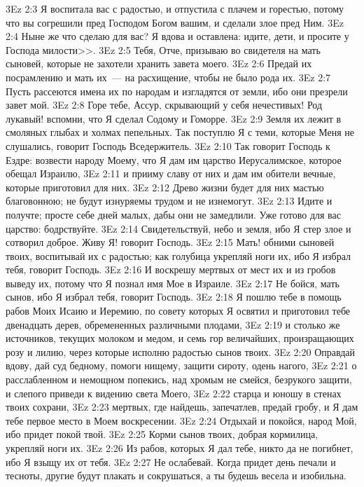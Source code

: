 \vs 3Ez 2:3 Я воспитала вас с радостью, и отпустила с плачем и горестью, потому что вы согрешили пред Господом Богом вашим, и сделали злое пред Ним.
\vs 3Ez 2:4 Ныне же что сделаю для вас? Я вдова и оставлена: идите, дети, и просите у Господа милости>>.
\vs 3Ez 2:5 Тебя, Отче, призываю во свидетеля на мать сыновей, которые не захотели хранить завета моего.
\vs 3Ez 2:6 Предай их посрамлению и мать их~--- на расхищение, чтобы не было рода их.
\vs 3Ez 2:7 Пусть рассеются имена их по народам и изгладятся от земли, ибо они презрели завет мой.
\vs 3Ez 2:8 Горе тебе, Ассур, скрывающий у себя нечестивых! Род лукавый! вспомни, что Я сделал Содому и Гоморре.
\vs 3Ez 2:9 Земля их лежит в смоляных глыбах и холмах пепельных. Так поступлю Я с теми, которые Меня не слушались, говорит Господь Вседержитель.
\vs 3Ez 2:10 Так говорит Господь к Ездре: возвести народу Моему, что Я дам им царство Иерусалимское, которое обещал Израилю,
\vs 3Ez 2:11 и прииму славу от них и дам им обители вечные, которые приготовил для них.
\vs 3Ez 2:12 Древо жизни будет для них мастью благовонною; не будут изнуряемы трудом и не изнемогут.
\vs 3Ez 2:13 Идите и получте; просте себе дней малых, дабы они не замедлили. Уже готово для вас царство: бодрствуйте.
\vs 3Ez 2:14 Свидетельствуй, небо и земля, ибо Я стер злое и сотворил доброе. Живу Я! говорит Господь.
\vs 3Ez 2:15 Мать! обними сыновей твоих, воспитывай их с радостью; как голубица укрепляй ноги их, ибо Я избрал тебя, говорит Господь.
\vs 3Ez 2:16 И воскрешу мертвых от мест их и из гробов выведу их, потому что Я познал имя Мое в Израиле.
\vs 3Ez 2:17 Не бойся, мать сынов, ибо Я избрал тебя, говорит Господь.
\vs 3Ez 2:18 Я пошлю тебе в помощь рабов Моих Исаию и Иеремию, по совету которых Я освятил и приготовил тебе двенадцать дерев, обремененных различными плодами,
\vs 3Ez 2:19 и столько же источников, текущих молоком и медом, и семь гор величайших, произращающих розу и лилию, через которые исполню радостью сынов твоих.
\vs 3Ez 2:20 Оправдай вдову, дай суд бедному, помоги нищему, защити сироту, одень нагого,
\vs 3Ez 2:21 о расслабленном и немощном попекись, над хромым не смейся, безрукого защити, и слепого приведи к видению света Моего,
\vs 3Ez 2:22 старца и юношу в стенах твоих сохрани,
\vs 3Ez 2:23 мертвых, где найдешь, запечатлев, предай гробу, и Я дам тебе первое место в Моем воскресении.
\vs 3Ez 2:24 Отдыхай и покойся, народ Мой, ибо придет покой твой.
\vs 3Ez 2:25 Корми сынов твоих, добрая кормилица, укрепляй ноги их.
\vs 3Ez 2:26 Из рабов, которых Я дал тебе, никто да не погибнет, ибо Я взыщу их от тебя.
\vs 3Ez 2:27 Не ослабевай. Когда придет день печали и тесноты, другие будут плакать и сокрушаться, а ты будешь весела и изобильна.
